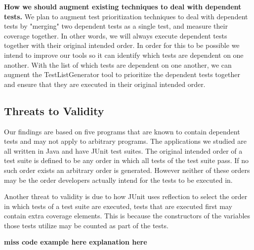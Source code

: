 \textbf{How we should augment existing techniques to deal with dependent tests.} We plan to augment test prioritization techniques to deal with dependent tests by "merging" two dependent tests as a single test, and measure their coverage together. In other words, we will always execute dependent tests together with their original intended order. 
In order for this to be possible we intend to improve our tools so it can identify which tests are dependent on one another. With the list of which tests are dependent on one another, we can augment the TestListGenerator tool to prioritize the dependent tests together and ensure that they are executed in their original intended order. 


\subsection{Threats to Validity}
Our findings are based on five programs that are known to contain dependent tests and may not apply to arbitrary programs. The applications we studied are all written in Java and have JUnit test suites. The original intended order of a test suite is defined to be any order in which all tests of the test suite pass. If no such order exists an arbitrary order is generated. However neither of these orders may be the order developers actually intend for the tests to be executed in.  
 

Another threat to validity is due to how JUnit uses reflection to select the order in which tests of a test suite are executed, tests that are executed first may contain extra coverage elements. This is because the constructors of the variables those tests utilize may be counted as part of the tests. 

\textbf{miss code example here explanation here}
